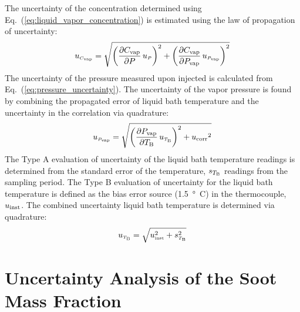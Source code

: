\documentclass[12pt]{article}
\begin{document}
The uncertainty of the concentration determined using Eq.~(\ref{eq:liquid_vapor_concentration}) is estimated using the law of propagation of uncertainty:
\begin{equation}
\label{eq:vapor_concentration_uncertainty}
u_{\scriptscriptstyle C_{\rm vap}} = \sqrt{{\left( \frac{\partial C_{\rm vap}}{\partial P}\,u_{\scriptscriptstyle P} \right) }^2+{\left(\frac{\partial C_{\rm vap}}{\partial P_{\rm vap}}\,u_{\scriptscriptstyle P_{\rm vap}}\right)}^2}
\end{equation}
The uncertainty of the pressure measured upon injected is calculated from Eq.~(\ref{eq:pressure_uncertainty}). The uncertainty of the vapor pressure is found by combining the propagated error of liquid bath temperature and the uncertainty in the correlation via quadrature:
\begin{equation}
\label{eq:vapor_pressure_uncertainty}
u_{\scriptscriptstyle P_{\rm vap}} = \sqrt{{\left(\frac{\partial P_{\rm vap}}{\partial T_{\rm B}}\,u_{\scriptscriptstyle T_{\rm B}} \right)}^2+{u_{\rm corr}}^2}
\end{equation}
The Type A evaluation of uncertainty of the liquid bath temperature readings is determined from the standard error of the temperature, $s_{T_{\rm B}}$ readings from the sampling period. The Type B evaluation of uncertainty for the liquid bath temperature is defined as the bias error source (\SI{1.5}{\degree C}) in the thermocouple, $u_{\rm inst}$. The combined uncertainty liquid bath temperature is determined via quadrature:
\begin{equation}
\label{eq:temp_bath_uncertainty}
u_{\scriptscriptstyle T_{\rm B}} = \sqrt{u_{\rm \scriptscriptstyle inst}^2 + s_{\scriptscriptstyle T_{\rm B}}^2}
\end{equation}

\pagebreak

\section{Uncertainty Analysis of the Soot Mass Fraction} \label{sec:Uncertainty_Soot_Frac}
\end{document}
